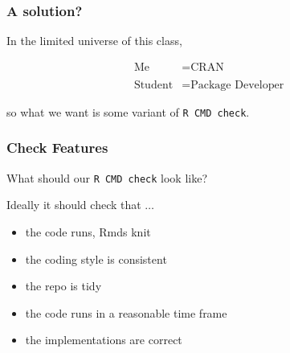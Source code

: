 \documentclass[12pt]{beamer}
\begin{document}
\begin{frame}[fragile]
\frametitle{A solution?}

In the limited universe of this class,

\begin{align*}
\text{Me} &= \text{CRAN} \\
\\
\text{Student} &= \text{Package Developer}
\end{align*}

so what we want is some variant of \texttt{R CMD check}.

\end{frame}


\begin{frame}
\frametitle{Check Features}

What should our \texttt{R CMD check} look like?

\vspace{3mm}\pause

Ideally it should check that $\ldots$
\begin{itemize}
\item the code runs, Rmds knit
\item the coding style is consistent
\item the repo is tidy
\item the code runs in a reasonable time frame
\item the implementations are correct
\end{itemize}

\end{frame}
\end{document}
